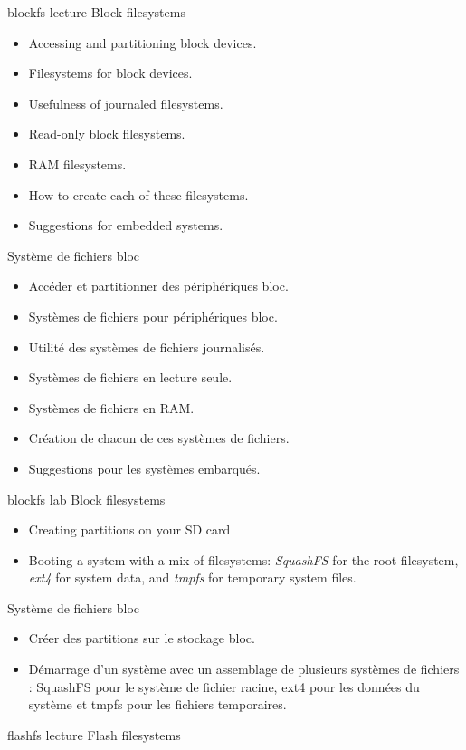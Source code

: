 {blockfs}
{lecture}
{Block filesystems}
{
  \begin{itemize}
  \item Accessing and partitioning block devices.
  \item Filesystems for block devices.
  \item Usefulness of journaled filesystems.
  \item Read-only block filesystems.
  \item RAM filesystems.
  \item How to create each of these filesystems.
  \item Suggestions for embedded systems.
  \end{itemize}
}
{Système de fichiers bloc}
{
  \begin{itemize}
  \item Accéder et partitionner des périphériques bloc.
  \item Systèmes de fichiers pour périphériques bloc.
  \item Utilité des systèmes de fichiers journalisés.
  \item Systèmes de fichiers en lecture seule.
  \item Systèmes de fichiers en RAM.
  \item Création de chacun de ces systèmes de fichiers.
  \item Suggestions pour les systèmes embarqués.
  \end{itemize}
}
{blockfs}
{lab}
{Block filesystems}
{
  \begin{itemize}
  \item Creating partitions on your SD card
  \item Booting a system with a mix of filesystems: {\em SquashFS} for
    the root filesystem, {\em ext4} for system data, and {\em
      tmpfs} for temporary system files.
  \end{itemize}
}
{Système de fichiers bloc}
{
  \begin{itemize}
  \item Créer des partitions sur le stockage bloc.
  \item Démarrage d'un système avec un assemblage de plusieurs systèmes
    de fichiers : SquashFS pour le système de fichier racine, ext4 pour
    les données du système et tmpfs pour les fichiers temporaires.
  \end{itemize}
}
{flashfs}
{lecture}
{Flash filesystems}
